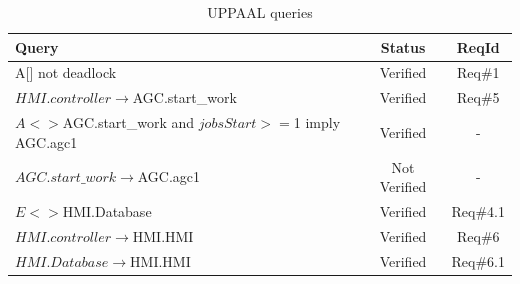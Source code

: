 \begin{table}[ht]
\centering
\begin{tabular}{|p{4.5cm}|c|c|}
\hline
Query & Status & ReqId \\ \hline
A[] not deadlock & Verified & Req\#1 \\ \hline
$HMI.controller \rightarrow $AGC.start\_work & Verified &  Req\#5 \\ \hline
$A<> $AGC.start\_work and $jobsStart>=$1 imply AGC.agc1 & Verified & - \\ \hline
$AGC.start\_work \rightarrow $AGC.agc1   & Not Verified  & - \\ \hline
$E<> $HMI.Database  & Verified & Req\#4.1 \\ \hline
$HMI.controller \rightarrow $HMI.HMI & Verified  &Req\#6 \\ \hline
$HMI.Database \rightarrow $HMI.HMI & Verified & Req\#6.1 \\ \hline
\end{tabular}
\caption{UPPAAL queries}
\label{tab:uppaal_queries}
\end{table}
